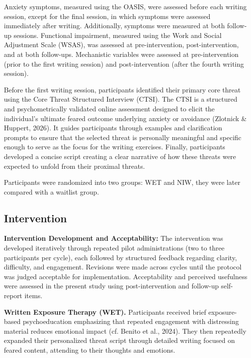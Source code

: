\documentclass[
  man,floatsintext]{apa7}
\begin{document}
Anxiety symptoms, measured using the OASIS, were assessed before each writing session, except for the final session, in which symptoms were assessed immediately after writing.
Additionally, symptoms were measured at both follow-up sessions.
Functional impairment, measured using the Work and Social Adjustment Scale (WSAS), was assessed at pre-intervention, post-intervention, and at both follow-ups.
Mechanistic variables were assessed at pre-intervention (prior to the first writing session) and post-intervention (after the fourth writing session).

Before the first writing session, participants identified their primary core threat using the Core Threat Structured Interview (CTSI).
The CTSI is a structured and psychometrically validated online assessment designed to elicit the individual's ultimate feared outcome underlying anxiety or avoidance (Zlotnick \& Huppert, 2026).
It guides participants through examples and clarification prompts to ensure that the selected threat is personally meaningful and specific enough to serve as the focus for the writing exercises.
Finally, participants developed a concise script creating a clear narrative of how these threats were expected to unfold from their proximal threats.

Participants were randomized into two groups: WET and NIW, they were later compared with a waitlist group.

\subsection{Intervention}\label{intervention}

\textbf{Intervention Development and Acceptability:}
The intervention was developed iteratively through repeated pilot administrations (two to three participants per cycle), each followed by structured feedback regarding clarity, difficulty, and engagement.
Revisions were made across cycles until the protocol was judged acceptable for implementation.
Acceptability and perceived usefulness were assessed in the present study using post-intervention and follow-up self-report items.

\textbf{Written Exposure Therapy (WET).}
Participants received brief exposure-based psychoeducation emphasizing that repeated engagement with distressing material reduces emotional impact (cf. Benito et al., 2024).
They then repeatedly expanded their personalized threat script through detailed writing focused on feared content, attending to their thoughts and emotions.
\end{document}
